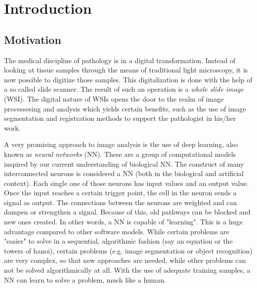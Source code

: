 \chapter{Introduction}

\section{Motivation}
The medical discipline of pathology is in a digital transformation. Instead of looking at tissue samples through the means of traditional light microscopy, it is now possible to digitize those samples. This digitalization is done with the help of a so called slide scanner. The result of such an operation is a \emph{whole slide image} (WSI)\cite{Cornish13}. The digital nature of WSIs opens the door to the realm of image processesing and analysis which yields certain benefits, such as the use of image segmentation and registration methods to support the pathologist in his/her work.

A very promising approach to image analysis is the use of deep learning, also known as \emph{neural networks} (NN). These are a group of computational models inspired by our current understanding of biological NN. The construct of many interconnected neurons is considered a NN (both in the biological and artificial context). Each single one of those neurons has input values and an output value. Once the input reaches a certain trigger point, the cell in the neuron sends a signal as output. The connections between the neurons are weighted and can dampen or strengthen a signal. Because of this, old pathways can be blocked and new ones created. In other words, a NN is capable of "learning"\cite{Kriesel07}. This is a huge advantage compared to other software models. While certain problems are "easier" to solve in a sequential, algorithmic fashion (say an equation or the towers of hanoi), certain problems (e.g. image segmentation or object recognition) are very complex, so that new approaches are needed, while other problems can not be solved algorithmically at all. With the use of adequate training samples, a NN can learn to solve a problem, much like a human.

